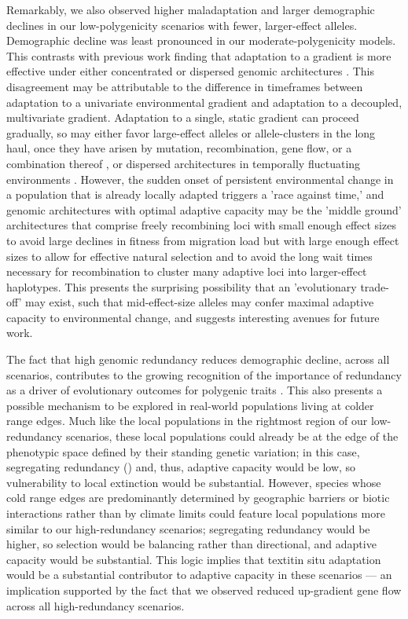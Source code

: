 \documentclass[9pt,twocolumn,twoside,lineno]{new_article}
\begin{document}
Remarkably, we also observed higher maladaptation and larger demographic declines
in our low-polygenicity scenarios with fewer, larger-effect alleles.
Demographic decline was least pronounced
in our moderate-polygenicity models.
This contrasts with previous work finding that adaptation
to a gradient is more effective under either
concentrated or dispersed genomic architectures \cite{yeaman_whitlock}.
This disagreement may be attributable to the
difference in timeframes between adaptation to a univariate environmental gradient
and adaptation to a decoupled, multivariate gradient.
Adaptation to a single, static gradient can proceed gradually,
so may either favor large-effect alleles or allele-clusters in the long haul,
once they have arisen by mutation, recombination, gene flow, or a combination thereof \cite{yeaman_amnat,yeaman_review},
or dispersed architectures in temporally fluctuating environments \cite{burger,kondrashov,yeaman_review,yeaman_whitlock}.
However, the sudden onset of persistent environmental change 
in a population that is already locally adapted triggers a 'race against time,' 
and genomic architectures with
optimal adaptive capacity may be the 'middle ground' architectures that comprise
freely recombining loci with small enough effect sizes to avoid large declines in fitness from migration load
but with large enough effect sizes to allow for effective natural selection and to avoid the long wait times necessary
for recombination to cluster many adaptive loci into larger-effect haplotypes.
This presents the surprising possibility that an 'evolutionary trade-off' may exist, such
that mid-effect-size alleles may confer maximal adaptive capacity to environmental
change, and suggests interesting avenues for future work.

The fact that high genomic redundancy reduces demographic decline,
across all scenarios, contributes to the growing recognition of the importance of redundancy
as a driver of evolutionary outcomes for polygenic traits
\cite{laruson,yeaman_review}.
This also presents a possible mechanism to be explored
in real-world populations living at colder range edges.
Much like the local populations in the rightmost region of our low-redundancy scenarios,
these local populations could already be at the edge of the phenotypic space defined by
their standing genetic variation;
in this case, 
segregating redundancy (\cite{laruson}) and, thus,
adaptive capacity would be low,
so vulnerability to local extinction would be substantial.
However, species whose cold range edges are predominantly determined by geographic barriers
or biotic interactions rather than by climate limits \cite{thomas}
could feature local populations more similar to our high-redundancy scenarios;
segregating redundancy would be higher,
so selection would be balancing rather than directional, and adaptive capacity would be substantial.
This logic implies that textit{in situ} adaptation would be a substantial contributor to
adaptive capacity in these scenarios --- an implication supported by the fact that
we observed reduced up-gradient gene flow across all high-redundancy scenarios.
\end{document}
